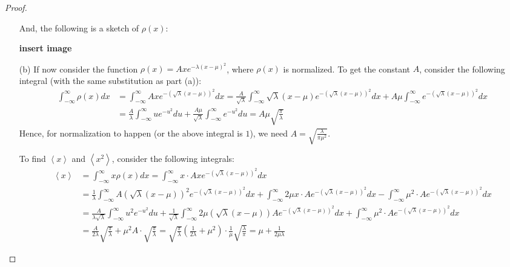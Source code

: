 \documentclass{article}
\begin{document}
\begin{proof}
\begin{itemize}
        And, the following is a sketch of $\rho(x)$:

        \textbf{insert image}

        \item[(b)] If now consider the function $\rho(x)=A xe^{-\lambda(x-\mu)^2}$, where $\rho(x)$ is normalized. To get the constant $A$, consider the following integral (with the same substitution as part (a)):
        \begin{align}
            \int_{-\infty}^{\infty}\rho(x)dx &= \int_{-\infty}^{\infty}A xe^{-(\sqrt{\lambda}(x-\mu))^2}dx = \frac{A}{\sqrt{\lambda}}\int_{-\infty}^{\infty}\sqrt{\lambda}(x-\mu)e^{-(\sqrt{\lambda}(x-\mu))^2}dx + A\mu\int_{-\infty}^{\infty}e^{-(\sqrt{\lambda}(x-\mu))^2}dx\\
            &= \frac{A}{\lambda}\int_{-\infty}^{\infty}ue^{-u^2}du + \frac{A\mu}{\sqrt{\lambda}}\int_{-\infty}^{\infty}e^{-u^2}du = A\mu\sqrt{\frac{\pi}{\lambda}}
        \end{align}
        Hence, for normalization to happen (or the above integral is $1$), we need $A=\sqrt{\frac{\lambda}{\pi \mu^2}}$.

        \hfil

        To find $\left<x\right>$ and $\left<x^2\right>$, consider the following integrals:
        \begin{align}
            \left<x\right>&=\int_{-\infty}^{\infty}x\rho(x)dx = \int_{-\infty}^{\infty}x \cdot Axe^{-(\sqrt{\lambda}(x-\mu))^2}dx\\
            &= \frac{1}{\lambda}\int_{-\infty}^{\infty}A(\sqrt{\lambda}(x-\mu))^2e^{-(\sqrt{\lambda}(x-\mu))^2}dx + \int_{-\infty}^{\infty}2\mu x\cdot Ae^{-(\sqrt{\lambda}(x-\mu))^2}dx - \int_{-\infty}^{\infty}\mu^2\cdot Ae^{-(\sqrt{\lambda}(x-\mu))^2}dx\\
            &= \frac{A}{\lambda\sqrt{\lambda}}\int_{-\infty}^{\infty}u^2e^{-u^2}du + \frac{1}{\sqrt{\lambda}}\int_{-\infty}^{\infty}2\mu(\sqrt{\lambda}(x-\mu))Ae^{-(\sqrt{\lambda}(x-\mu))^2}dx + \int_{-\infty}^{\infty}\mu^2\cdot Ae^{-(\sqrt{\lambda}(x-\mu))^2}dx\\
            &= \frac{A}{2\lambda}\sqrt{\frac{\pi}{\lambda}}+\mu^2A\cdot\sqrt{\frac{\pi}{\lambda}} = \sqrt{\frac{\pi}{\lambda}}\left(\frac{1}{2\lambda}+\mu^2\right)\cdot\frac{1}{\mu}\sqrt{\frac{\lambda}{\pi}} = \mu+\frac{1}{2\mu\lambda}
        \end{align}

        \hfil


\end{itemize}
\end{proof}
\end{document}
